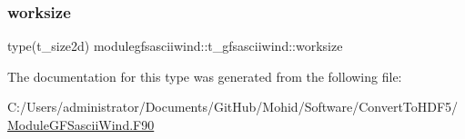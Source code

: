 \mbox{\label{structmodulegfsasciiwind_1_1t__gfsasciiwind_aa38d66840f358e5cd1dcfc74d4adc76f}} 
\subsubsection{\texorpdfstring{worksize}{worksize}}
{\footnotesize\ttfamily type(t\+\_\+size2d) modulegfsasciiwind\+::t\+\_\+gfsasciiwind\+::worksize\hspace{0.3cm}{\ttfamily [private]}}



The documentation for this type was generated from the following file\+:\begin{DoxyCompactItemize}
\item 
C\+:/\+Users/administrator/\+Documents/\+Git\+Hub/\+Mohid/\+Software/\+Convert\+To\+H\+D\+F5/\mbox{\hyperlink{_module_g_f_sascii_wind_8_f90}{Module\+G\+F\+Sascii\+Wind.\+F90}}\end{DoxyCompactItemize}
